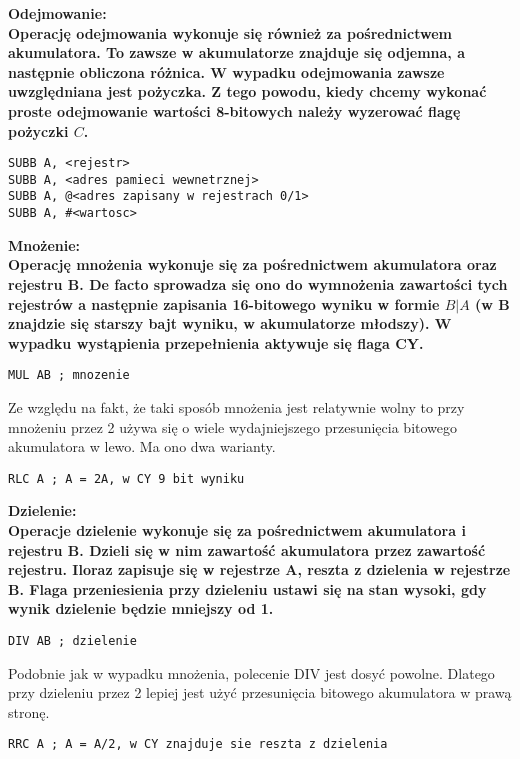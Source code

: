 \documentclass[a4paper,12pt]{article}
\newcommand{\h}[1]{\noindent \bf #1 \rm \\ \noindent}
\begin{document}
\h{Odejmowanie:}
Operację odejmowania wykonuje się również za pośrednictwem akumulatora. To zawsze w akumulatorze znajduje się odjemna, a następnie obliczona różnica. W wypadku odejmowania zawsze uwzględniana jest pożyczka. Z tego powodu, kiedy chcemy wykonać proste odejmowanie wartości 8-bitowych należy wyzerować flagę pożyczki $C$.
\begin{lstlisting}[language={[x86masm]Assembler}]
SUBB A, <rejestr>
SUBB A, <adres pamieci wewnetrznej>
SUBB A, @<adres zapisany w rejestrach 0/1>
SUBB A, #<wartosc>
\end{lstlisting}
\vspace{5mm}

\h{Mnożenie:}
Operację mnożenia wykonuje się za pośrednictwem akumulatora oraz rejestru B. De facto sprowadza się ono do wymnożenia zawartości tych rejestrów a następnie zapisania 16-bitowego wyniku w formie $B|A$ (w B znajdzie się starszy bajt wyniku, w akumulatorze młodszy). W wypadku wystąpienia przepełnienia aktywuje się flaga CY.
\begin{lstlisting}[language={[x86masm]Assembler}]
MUL AB ; mnozenie
\end{lstlisting}
\vspace{5mm}

\noindent
Ze względu na fakt, że taki sposób mnożenia jest relatywnie wolny to przy mnożeniu przez 2 używa się o wiele wydajniejszego przesunięcia bitowego akumulatora w lewo. Ma ono dwa warianty.
\begin{lstlisting}[language={[x86masm]Assembler}]
RLC A ; A = 2A, w CY 9 bit wyniku
\end{lstlisting}
\vspace{5mm}

\h{Dzielenie:}
Operacje dzielenie wykonuje się za pośrednictwem akumulatora i rejestru B. Dzieli się w nim zawartość akumulatora przez zawartość rejestru. Iloraz zapisuje się w rejestrze A, reszta z dzielenia w rejestrze B. Flaga przeniesienia przy dzieleniu ustawi się na stan wysoki, gdy wynik dzielenie będzie mniejszy od 1.
\begin{lstlisting}[language={[x86masm]Assembler}]
DIV AB ; dzielenie
\end{lstlisting}
\vspace{5mm}

\noindent
Podobnie jak w wypadku mnożenia, polecenie DIV jest dosyć powolne. Dlatego przy dzieleniu przez 2 lepiej jest użyć przesunięcia bitowego akumulatora w prawą stronę.
\begin{lstlisting}[language={[x86masm]Assembler}]
RRC A ; A = A/2, w CY znajduje sie reszta z dzielenia
\end{lstlisting}
\vspace{5mm}
\end{document}
